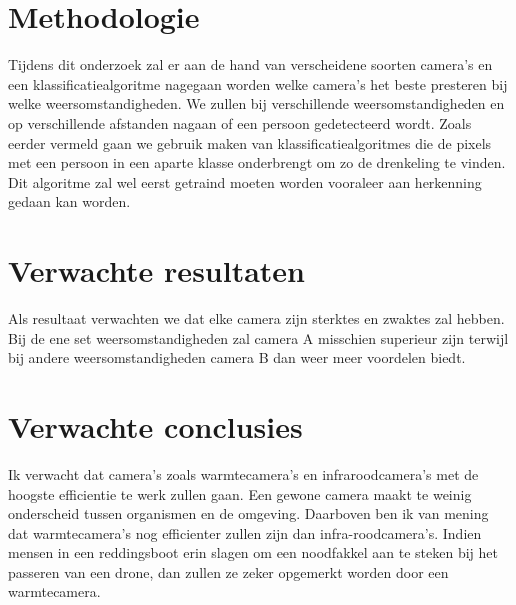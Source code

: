 \section{Methodologie}
\label{sec:methodologie}

Tijdens dit onderzoek zal er aan de hand van verscheidene soorten camera's en een klassificatiealgoritme nagegaan worden welke camera's het beste presteren bij welke weersomstandigheden. We zullen bij verschillende weersomstandigheden en op verschillende afstanden nagaan of een persoon gedetecteerd wordt. Zoals eerder vermeld gaan we gebruik maken van klassificatiealgoritmes die de pixels met een persoon in een aparte klasse onderbrengt om zo de drenkeling te vinden. Dit algoritme zal wel eerst getraind moeten worden vooraleer aan herkenning gedaan kan worden.

\section{Verwachte resultaten}
\label{sec:verwachte_resultaten}

Als resultaat verwachten we dat elke camera zijn sterktes en zwaktes zal hebben. Bij de ene set weersomstandigheden zal camera A misschien superieur zijn terwijl bij andere weersomstandigheden camera B dan weer meer voordelen biedt. 

\section{Verwachte conclusies}
\label{sec:verwachte_conclusies}

Ik verwacht dat camera's zoals warmtecamera's en infraroodcamera's met de hoogste efficientie te werk zullen gaan. Een gewone camera maakt te weinig onderscheid tussen organismen en de omgeving. Daarboven ben ik van mening dat warmtecamera's nog efficienter zullen zijn dan infra-roodcamera's. Indien mensen in een reddingsboot erin slagen om een noodfakkel aan te steken bij het passeren van een drone, dan zullen ze zeker opgemerkt worden door een warmtecamera. 

